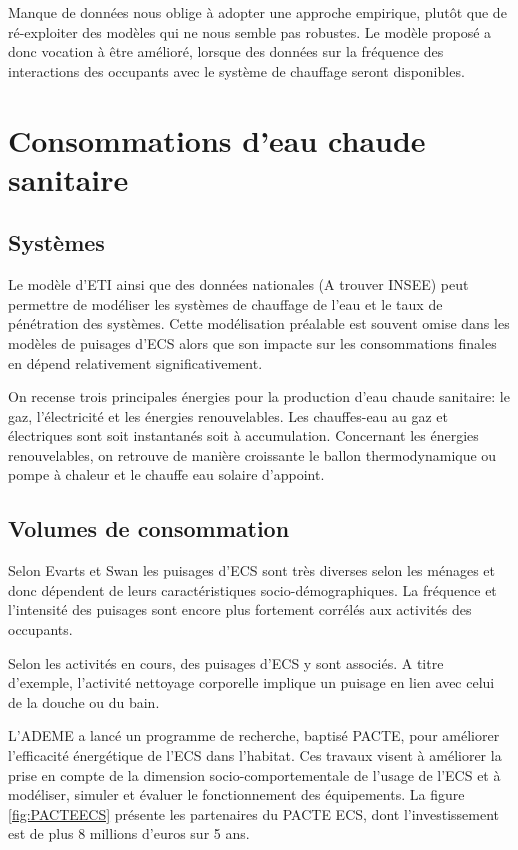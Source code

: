 Manque de données nous oblige à adopter une approche empirique, plutôt que de ré-exploiter des modèles qui ne nous semble pas robustes. Le modèle proposé a donc vocation à être amélioré, lorsque des données sur la fréquence des interactions des occupants avec le système de chauffage seront disponibles.



\section{Consommations d'eau chaude sanitaire}

\subsection{Systèmes}

Le modèle d'ETI ainsi que des données nationales (A trouver INSEE) peut permettre de modéliser les systèmes de chauffage de l'eau et le taux de pénétration des systèmes. Cette modélisation préalable est souvent omise dans les modèles de puisages d'ECS alors que son impacte sur les consommations finales en dépend relativement significativement.

On recense trois principales énergies pour la production d'eau chaude sanitaire: le gaz, l'électricité et les énergies renouvelables. Les chauffes-eau au gaz et électriques sont soit instantanés soit à accumulation. Concernant les énergies renouvelables, on retrouve de manière croissante le ballon thermodynamique ou pompe à chaleur et le chauffe eau solaire d'appoint.

\subsection{Volumes de consommation}

Selon Evarts et Swan \cite{Evarts-13} les puisages d'ECS sont très diverses selon les ménages et donc dépendent de leurs caractéristiques socio-démographiques. La fréquence et l'intensité des puisages sont encore plus fortement corrélés aux activités des occupants.

Selon les activités en cours, des puisages d'ECS y sont associés. A titre d'exemple, l'activité nettoyage corporelle implique un puisage en lien avec celui de la douche ou du bain.

L'ADEME a lancé un programme de recherche, baptisé PACTE, pour améliorer l'efficacité énergétique de l'ECS dans l'habitat. Ces travaux visent à améliorer la prise en compte de la dimension socio-comportementale de l'usage de l'ECS et à modéliser, simuler et évaluer le fonctionnement des équipements. La figure \ref{fig:PACTEECS} présente les partenaires du PACTE ECS, dont l'investissement est de plus 8 millions d'euros sur 5 ans.

